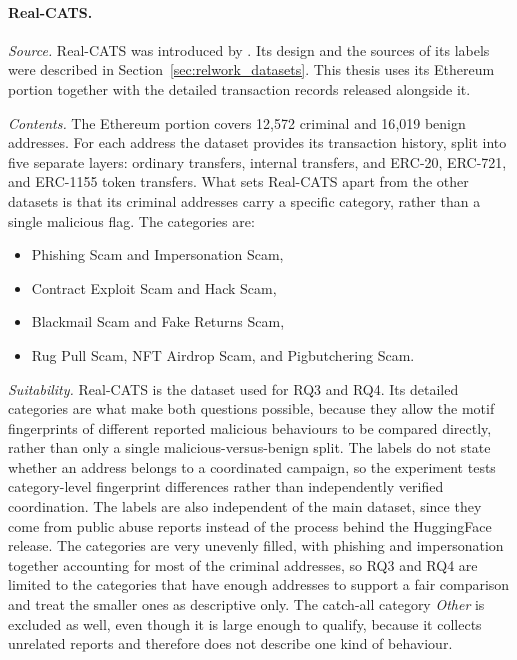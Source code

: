 \paragraph{Real-CATS.}
\label{sec:dataset_realcats}
\textit{Source.} Real-CATS was introduced by \citet{shi2025realcats}. Its design
and the sources of its labels were described in
Section~\ref{sec:relwork_datasets}. This thesis uses its Ethereum portion
together with the detailed transaction records released alongside it.

\textit{Contents.} The Ethereum portion covers 12{,}572 criminal and 16{,}019
benign addresses. For each address the dataset provides its transaction history,
split into five separate layers: ordinary transfers, internal transfers, and
ERC-20, ERC-721, and ERC-1155 token transfers. What sets Real-CATS apart from
the other datasets is that its criminal addresses carry a specific category,
rather than a single malicious flag. The categories are:
\begin{itemize}
  \item Phishing Scam and Impersonation Scam,
  \item Contract Exploit Scam and Hack Scam,
  \item Blackmail Scam and Fake Returns Scam,
  \item Rug Pull Scam, NFT Airdrop Scam, and Pigbutchering Scam.
\end{itemize}

\textit{Suitability.} Real-CATS is the dataset used for RQ3 and RQ4. Its detailed
categories are what make both questions possible, because they allow the motif
fingerprints of different reported malicious behaviours to be compared directly,
rather than only a single malicious-versus-benign split. The labels do not state
whether an address belongs to a coordinated campaign, so the experiment tests
category-level fingerprint differences rather than independently verified
coordination. The labels are also
independent of the main dataset, since they come from public abuse reports
instead of the process behind the HuggingFace release. The categories are very
unevenly filled, with phishing and impersonation together accounting for most of
the criminal addresses, so RQ3 and RQ4 are limited to the categories that have
enough addresses to support a fair comparison and treat the smaller ones as
descriptive only. The catch-all category \emph{Other} is excluded as well, even
though it is large enough to qualify, because it collects unrelated reports and
therefore does not describe one kind of behaviour.

